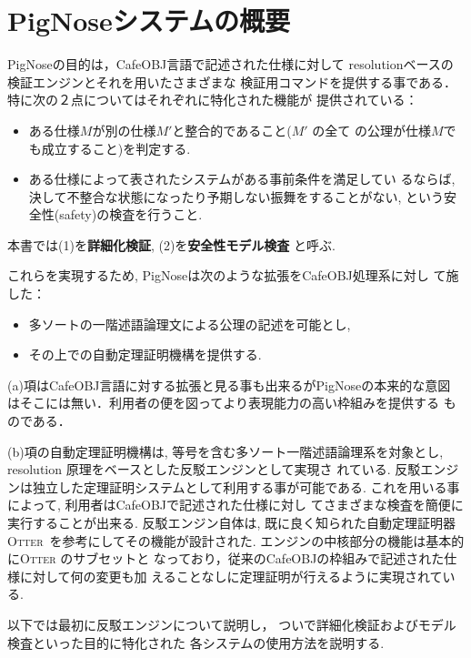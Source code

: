 \chapter{PigNoseシステムの概要}
\label{sec:system-overall}
PigNoseの目的は，CafeOBJ言語で記述された仕様に対して
resolutionベースの検証エンジンとそれを用いたさまざまな
検証用コマンドを提供する事である．
特に次の２点についてはそれぞれに特化された機能が
提供されている：
\begin{itemize}
\item[(1)] ある仕様$M$が別の仕様$M'$と整合的であること($M'$ の全て
  の公理が仕様$M$でも成立すること)を判定する.

\item[(2)] ある仕様によって表されたシステムがある事前条件を満足してい
  るならば, 決して不整合な状態になったり予期しない振舞をすることがない,
  という安全性(safety)の検査を行うこと.
\end{itemize}
本書では(1)を\textbf{詳細化検証}, (2)を\textbf{安全性モデル検査
  }と呼ぶ. 

これらを実現するため, PigNoseは次のような拡張をCafeOBJ処理系に対し
て施した：
\begin{itemize}
\item[(a)] 多ソートの一階述語論理文による公理の記述を可能とし, 
\item[(b)] その上での自動定理証明機構を提供する.
\end{itemize}
(a)項はCafeOBJ言語に対する拡張と見る事も出来るがPigNoseの本来的な意図
はそこには無い．利用者の便を図ってより表現能力の高い枠組みを提供する
ものである．

(b)項の自動定理証明機構は, 等号を含む多ソート一階述語論理系を対象とし, 
resolution 原理\cite{chang-lee}をベースとした反駁エンジンとして実現さ
れている. 
反駁エンジンは独立した定理証明システムとして利用する事が可能である.
これを用いる事によって, 利用者はCafeOBJで記述された仕様に対し
てさまざまな検査を簡便に実行することが出来る. 
反駁エンジン自体は, 既に良く知られた自動定理証明器
\textsc{Otter}~\cite{otter}を参考にしてその機能が設計された.
エンジンの中核部分の機能は基本的に\textsc{Otter} のサブセットと
なっており，従来のCafeOBJの枠組みで記述された仕様に対して何の変更も加
えることなしに定理証明が行えるように実現されている.

以下では最初に反駁エンジンについて説明し，
ついで詳細化検証およびモデル検査といった目的に特化された
各システムの使用方法を説明する.

